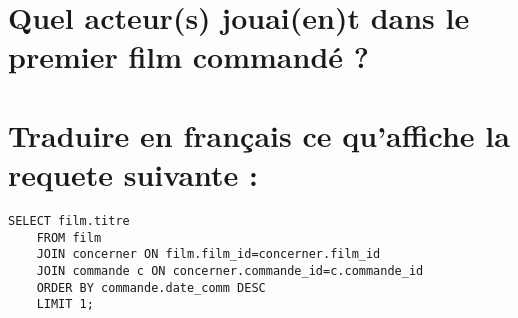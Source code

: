 \documentclass[]{scrartcl}
\begin{document}
\section{Quel acteur(s) jouai(en)t dans le premier film commandé ?}

\section{Traduire en français ce qu'affiche la requete suivante :}

\begin{lstlisting}[frame=single]  
	SELECT film.titre
	FROM film
	JOIN concerner ON film.film_id=concerner.film_id
	JOIN commande c ON concerner.commande_id=c.commande_id
	ORDER BY commande.date_comm DESC
	LIMIT 1;
\end{lstlisting}
\end{document}
